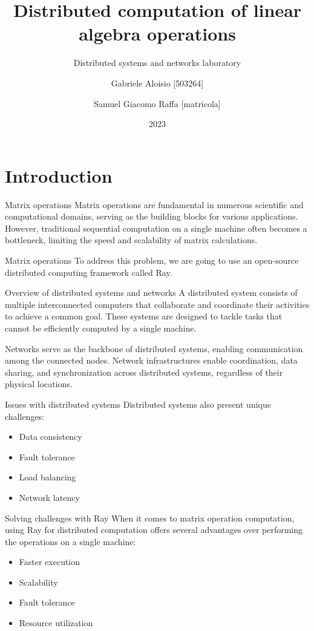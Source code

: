 \documentclass{beamer}
\title{Distributed computation of linear algebra operations}
\subtitle{Distributed systems and networks laboratory}
\author{
    Gabriele Aloisio [503264] \and
    Samuel Giacomo Raffa [matricola]
    }
\institute{Università degli studi di Messina}
\date{2023}
\begin{document}
\maketitle

\section{Introduction}
\begin{frame}{Matrix operations}
    Matrix operations are fundamental in numerous scientific and computational domains, serving as the building blocks for various applications. However, traditional sequential computation on a single machine often becomes a bottleneck, limiting the speed and scalability of matrix calculations.
\end{frame}

\begin{frame}{Matrix operations}
    To address this problem, we are going to use an open-source distributed computing framework called \alert{Ray}.
\end{frame}

\begin{frame}{Overview of distributed systems and networks}
A \alert{distributed system} consists of multiple interconnected computers that collaborate and coordinate their activities to achieve a common goal. These systems are designed to tackle  tasks that cannot be efficiently computed by a single machine.

\alert{Networks} serve as the backbone of distributed systems, enabling communication among the connected nodes. Network infrastructures enable coordination, data sharing, and synchronization across distributed systems, regardless of their physical locations.
\end{frame}


\begin{frame}{Issues with distributed systems}
    Distributed systems also present unique challenges:
    \begin{itemize}
        \item{Data consistency}
        \item {Fault tolerance}
        \item {Load balancing}
        \item {Network latency}
    \end{itemize}
\end{frame}

\begin{frame}{Solving challenges with Ray}
    When it comes to matrix operation computation, using Ray for distributed computation offers several advantages over performing the operations on a single machine:
    \begin{itemize}
    \item Faster execution
    \item Scalability
    \item Fault tolerance
    \item Resource utilization
    \end{itemize}
\end{frame}
\end{document}
